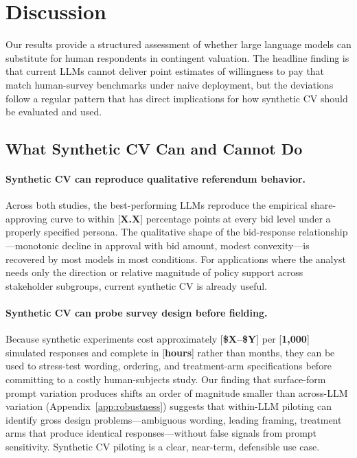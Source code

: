 \documentclass[12pt]{article}
\begin{document}
\section{Discussion}\label{sec:discussion}

Our results provide a structured assessment of whether large language
models can substitute for human respondents in contingent valuation. The
headline finding is that current LLMs cannot deliver point estimates of
willingness to pay that match human-survey benchmarks under naive
deployment, but the deviations follow a regular pattern that has direct
implications for how synthetic CV should be evaluated and used.

\subsection{What Synthetic CV Can and Cannot Do}\label{sec:disc-can-cant}

\paragraph{Synthetic CV can reproduce qualitative referendum behavior.}
Across both studies, the best-performing LLMs reproduce the empirical
share-approving curve to within [\textbf{X.X}] percentage points at every
bid level under a properly specified persona. The qualitative shape of
the bid-response relationship---monotonic decline in approval with bid
amount, modest convexity---is recovered by most models in most
conditions. For applications where the analyst needs only the direction
or relative magnitude of policy support across stakeholder subgroups,
current synthetic CV is already useful.

\paragraph{Synthetic CV can probe survey design before fielding.} Because
synthetic experiments cost approximately [\textbf{\$X--\$Y}] per
[\textbf{1{,}000}] simulated responses and complete in [\textbf{hours}]
rather than months, they can be used to stress-test wording, ordering,
and treatment-arm specifications before committing to a costly
human-subjects study. Our finding that surface-form prompt variation
produces shifts an order of magnitude smaller than across-LLM variation
(Appendix~\ref{app:robustness}) suggests that within-LLM piloting can
identify gross design problems---ambiguous wording, leading framing,
treatment arms that produce identical responses---without false signals
from prompt sensitivity. Synthetic CV piloting is a clear, near-term,
defensible use case.
\end{document}
